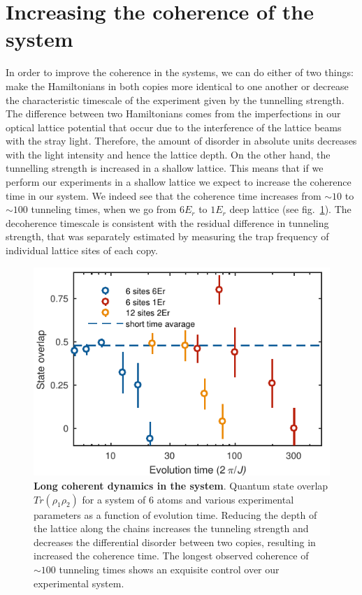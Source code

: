 \section{Increasing the coherence of the system}
In order to improve the coherence in the systems, we can do either of two things: make the Hamiltonians in both copies more identical to one another or decrease the characteristic timescale of the experiment given by the tunnelling strength. The difference between two Hamiltonians comes from the imperfections in our optical lattice potential that occur due to the interference of the lattice beams with the stray light. Therefore, the amount of disorder in absolute units decreases with the light intensity and hence the lattice depth. On the other hand, the tunnelling strength is increased in a shallow lattice. This means that if we perform our experiments in a shallow lattice we expect to increase the coherence time in our system. We indeed see that the coherence time increases from $\sim 10$ to $\sim 100$ tunneling times, when we go from $6 E_r$ to $1 E_r$ deep lattice (see fig.~\ref{fig:CBH_MBP_long_time}). The decoherence timescale is consistent with the residual difference in tunneling strength, that was separately estimated by measuring the trap frequency of individual lattice sites of each copy. 

\begin{figure}[t]
	\centering
	\includegraphics[scale=1]{figures/CBH_MBP_long_time.pdf}
	\caption{{\bf Long coherent dynamics in the system}. Quantum state overlap $Tr(\rho_1 \rho_2) $ for a system of $6$ atoms and various experimental parameters as a function of evolution time. Reducing the depth of the lattice along the chains increases the tunneling strength and decreases the differential disorder between two copies, resulting in increased the coherence time. The longest observed coherence of $\sim 100$ tunneling times shows an exquisite control over our experimental system.}
	\label{fig:CBH_MBP_long_time}
\end{figure}

